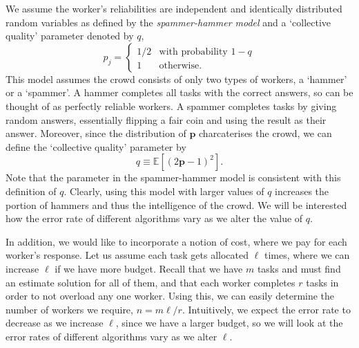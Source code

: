 \documentclass[12pt]{article}
\numberwithin{equation}{section}
\begin{document}
We assume the worker's reliabilities are independent and identically distributed random variables as defined by the \textsl{spammer-hammer model} and a `collective quality' parameter denoted by $q$,
\begin{equation*}
	p_{j} =
	\begin{cases}
		1/2 & \text{with probability } 1-q\\
		1 & \text{otherwise}.
	\end{cases}
\end{equation*}
This model assumes the crowd consists of only two types of workers, a `hammer' or a `spammer'. A hammer completes all tasks with the correct answers, so can be thought of as perfectly reliable workers. A spammer completes tasks by giving random answers, essentially flipping a fair coin and using the result as their answer.  Moreover, since the distribution of $\mathbf{p}$ charcaterises the crowd, we can define the `collective quality' parameter by
\begin{equation*}
	q \equiv \mathbb{E}[(2\mathbf{p}-1)^{2}].
\end{equation*}
Note that the parameter in the spammer-hammer model is consistent with this definition of $q$.
Clearly, using this model with larger values of $q$ increases the portion of hammers and thus the intelligence of the crowd. We will be interested how the error rate of different algorithms vary as we alter the value of $q$.

In addition, we would like to incorporate a notion of cost, where we pay for each worker's response. Let us assume each task gets allocated $\ell$ times, where we can increase $\ell$ if we have more budget. Recall that we have $m$ tasks and must find an estimate solution for all of them, and that each worker completes $r$ tasks in order to not overload any one worker. Using this, we can easily determine the number of workers we require, $n = m\ell/r$. Intuitively, we expect the error rate to decrease as we increase $\ell$, since we have a larger budget, so we will look at the error rates of different algorithms vary as we alter $\ell$.
\end{document}
